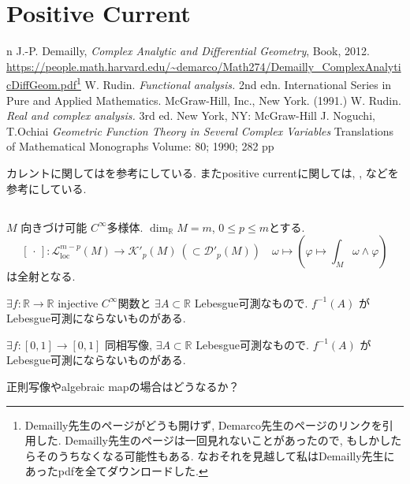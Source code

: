 \chapter{Positive Current}

\begin{thebibliography}{n}
J.-P. Demailly,
\textit{Complex Analytic and Differential Geometry},
Book, 2012.
\url{https://people.math.harvard.edu/~demarco/Math274/Demailly_ComplexAnalyticDiffGeom.pdf}\footnote{Demailly先生のページがどうも開けず, Demarco先生のページのリンクを引用した. Demailly先生のページは一回見れないことがあったので, もしかしたらそのうちなくなる可能性もある. なおそれを見越して私はDemailly先生にあったpdfを全てダウンロードした.}
W. Rudin. \textit{Functional analysis.} 2nd edn. International Series in Pure and Applied Mathematics. McGraw-Hill, Inc., New York. (1991.)
W. Rudin. \textit{Real and complex analysis. } 3rd ed. New York, NY: McGraw-Hill 
J. Noguchi, T.Ochiai \textit{Geometric Function Theory in Several Complex Variables} Translations of Mathematical Monographs
Volume: 80; 1990; 282 pp
\end{thebibliography}
 
カレントに関しては\cite[Chapter 3]{NO}を参考にしている. 
またpositive currentに関しては, 
\cite[Chapter 1. Section 3.C]{Dem}, \cite[Chapter 3. Section 1.]{Dem}
などを参考にしている. 



\section{}

\begin{tcolorbox}[mybox]
\begin{prop}
 \(M\) 向きづけ可能 \(C^\infty\)多様体. 
  \(\dim_{\mathbb R} M = m\),  \(0 \le p \le m\)とする. 
\[
[\,\cdot\,] : \mathcal{L}^{m-p}_{\mathrm{loc}}(M) \to \mathcal{K}'_p(M)\ (\subset \mathcal{D}'_p(M))
\quad
\omega \longmapsto \left(\varphi \mapsto \int_M \omega \wedge \varphi\right)
\]
は全射となる. 
\end{prop}
\end{tcolorbox}

\begin{rem}
 \(\exists f:\mathbb{R}\to\mathbb{R}\) injective \(C^\infty\)関数と \(\exists A \subset \mathbb{R}\) Lebesgue可測なもので. 
\(f^{-1}(A)\) がLebesgue可測にならないものがある.

\(\exists f:[0,1]\to[0,1]\) 同相写像, \(\exists A \subset \mathbb{R}\) Lebesgue可測なもので. 
\(f^{-1}(A)\) がLebesgue可測にならないものがある.
\end{rem}
\begin{ques}
正則写像やalgebraic mapの場合はどうなるか？
\end{ques}

